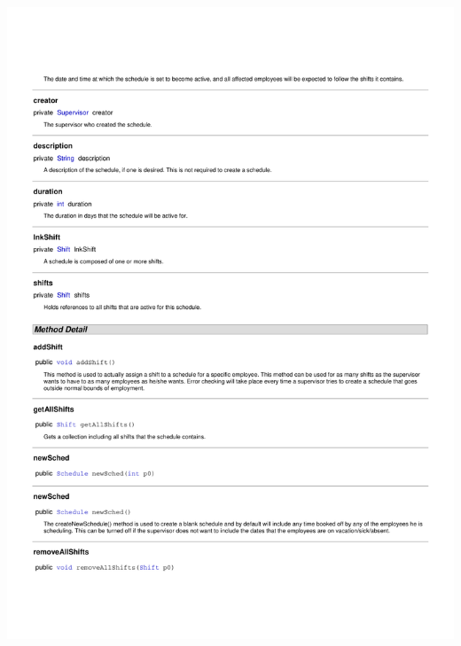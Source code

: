 \documentclass[letterpaper,12pt]{report}
\begin{document}
\includegraphics[scale=0.9,trim=20mm 30mm 25mm 25mm]{externals/ProblemDomainDataDictionary11.pdf}
\newpage
\end{document}
